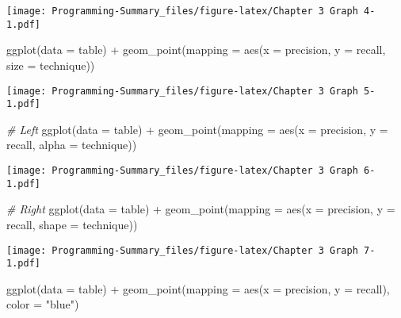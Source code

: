 \documentclass[
]{article}
\newenvironment{Shaded}{\begin{snugshade}}{\end{snugshade}}
\newcommand{\AttributeTok}[1]{\textcolor[rgb]{0.77,0.63,0.00}{#1}}
\newcommand{\CommentTok}[1]{\textcolor[rgb]{0.56,0.35,0.01}{\textit{#1}}}
\newcommand{\FunctionTok}[1]{\textcolor[rgb]{0.00,0.00,0.00}{#1}}
\newcommand{\NormalTok}[1]{#1}
\newcommand{\SpecialCharTok}[1]{\textcolor[rgb]{0.00,0.00,0.00}{#1}}
\newcommand{\StringTok}[1]{\textcolor[rgb]{0.31,0.60,0.02}{#1}}
\begin{document}
\texttt{[image: Programming-Summary\_files/figure-latex/Chapter 3 Graph 4-1.pdf]}

\begin{Shaded}
\begin{Highlighting}[]
\FunctionTok{ggplot}\NormalTok{(}\AttributeTok{data =}\NormalTok{ table) }\SpecialCharTok{+} 
  \FunctionTok{geom\_point}\NormalTok{(}\AttributeTok{mapping =} \FunctionTok{aes}\NormalTok{(}\AttributeTok{x =}\NormalTok{ precision, }\AttributeTok{y =}\NormalTok{ recall, }\AttributeTok{size =}\NormalTok{ technique))}
\end{Highlighting}
\end{Shaded}

\texttt{[image: Programming-Summary\_files/figure-latex/Chapter 3 Graph 5-1.pdf]}

\begin{Shaded}
\begin{Highlighting}[]
\CommentTok{\# Left}
\FunctionTok{ggplot}\NormalTok{(}\AttributeTok{data =}\NormalTok{ table) }\SpecialCharTok{+} 
  \FunctionTok{geom\_point}\NormalTok{(}\AttributeTok{mapping =} \FunctionTok{aes}\NormalTok{(}\AttributeTok{x =}\NormalTok{ precision, }\AttributeTok{y =}\NormalTok{ recall, }\AttributeTok{alpha =}\NormalTok{ technique))}
\end{Highlighting}
\end{Shaded}

\texttt{[image: Programming-Summary\_files/figure-latex/Chapter 3 Graph 6-1.pdf]}

\begin{Shaded}
\begin{Highlighting}[]
\CommentTok{\# Right}
\FunctionTok{ggplot}\NormalTok{(}\AttributeTok{data =}\NormalTok{ table) }\SpecialCharTok{+} 
  \FunctionTok{geom\_point}\NormalTok{(}\AttributeTok{mapping =} \FunctionTok{aes}\NormalTok{(}\AttributeTok{x =}\NormalTok{ precision, }\AttributeTok{y =}\NormalTok{ recall, }\AttributeTok{shape =}\NormalTok{ technique))}
\end{Highlighting}
\end{Shaded}

\texttt{[image: Programming-Summary\_files/figure-latex/Chapter 3 Graph 7-1.pdf]}

\begin{Shaded}
\begin{Highlighting}[]
\FunctionTok{ggplot}\NormalTok{(}\AttributeTok{data =}\NormalTok{ table) }\SpecialCharTok{+} 
  \FunctionTok{geom\_point}\NormalTok{(}\AttributeTok{mapping =} \FunctionTok{aes}\NormalTok{(}\AttributeTok{x =}\NormalTok{ precision, }\AttributeTok{y =}\NormalTok{ recall), }\AttributeTok{color =} \StringTok{"blue"}\NormalTok{)}
\end{Highlighting}
\end{Shaded}
\end{document}
